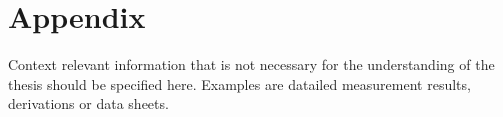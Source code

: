 \chapter{Appendix}\label{ch:appCh1}
Context relevant information that is not necessary for the understanding of the thesis should be specified here. Examples are datailed measurement results, derivations or data sheets.

